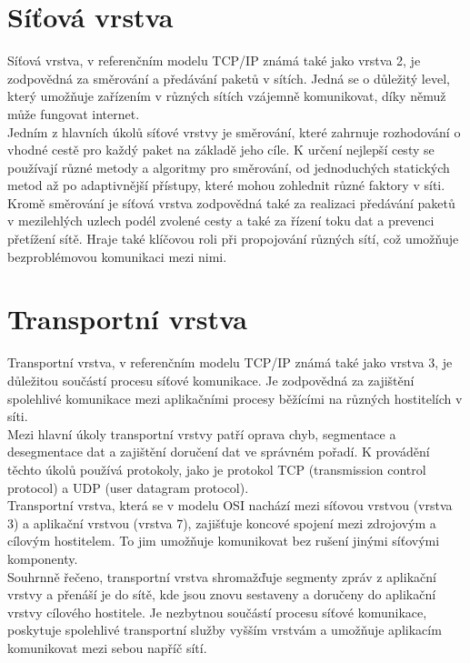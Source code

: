 \documentclass[12pt]{report}			%
\begin{document}
			\section{Síťová vrstva}
Síťová vrstva, v referenčním modelu TCP/IP známá také jako vrstva 2, je zodpovědná za směrování a předávání paketů v sítích. Jedná se o důležitý level, který umožňuje zařízením v různých sítích vzájemně komunikovat, díky němuž může fungovat internet.
\\
Jedním z hlavních úkolů síťové vrstvy je směrování, které zahrnuje rozhodování o vhodné cestě pro každý paket na základě jeho cíle. K určení nejlepší cesty se používají různé metody a algoritmy pro směrování, od jednoduchých statických metod až po adaptivnější přístupy, které mohou zohlednit různé faktory v síti.
\\
Kromě směrování je síťová vrstva zodpovědná také za realizaci předávání paketů v mezilehlých uzlech podél zvolené cesty a také za řízení toku dat a prevenci přetížení sítě. Hraje také klíčovou roli při propojování různých sítí, což umožňuje bezproblémovou komunikaci mezi nimi.\cite{sit1} \cite{sit2}


			\section{Transportní vrstva}
Transportní vrstva, v referenčním modelu TCP/IP známá také jako vrstva 3, je důležitou součástí procesu síťové komunikace. Je zodpovědná za zajištění spolehlivé komunikace mezi aplikačními procesy běžícími na různých hostitelích v síti.
\\
Mezi hlavní úkoly transportní vrstvy patří oprava chyb, segmentace a desegmentace dat a zajištění doručení dat ve správném pořadí. K provádění těchto úkolů používá protokoly, jako je protokol TCP (transmission control protocol) a UDP (user datagram protocol).
\\
Transportní vrstva, která se v modelu OSI nachází mezi síťovou vrstvou (vrstva 3) a aplikační vrstvou (vrstva 7), zajišťuje koncové spojení mezi zdrojovým a cílovým hostitelem. To jim umožňuje komunikovat bez rušení jinými síťovými komponenty.
\\
Souhrnně řečeno, transportní vrstva shromažďuje segmenty zpráv z aplikační vrstvy a přenáší je do sítě, kde jsou znovu sestaveny a doručeny do aplikační vrstvy cílového hostitele. Je nezbytnou součástí procesu síťové komunikace, poskytuje spolehlivé transportní služby vyšším vrstvám a umožňuje aplikacím komunikovat mezi sebou napříč sítí.\cite{tran1}\cite{tran2}\cite{tran3}
\end{document}
